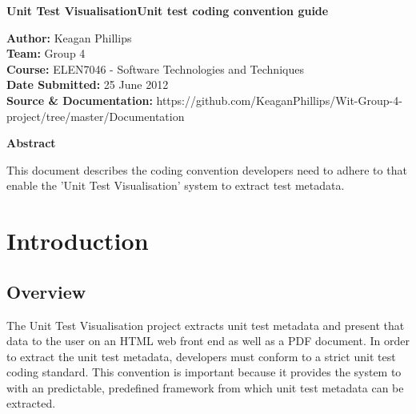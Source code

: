 \documentclass[a4paper,12pt]{article}
\begin{document}
\begin{center}
\begin{Huge}
\textbf{{\LARGE Unit Test Visualisation\linebreak Unit test coding convention guide }}
\linebreak
\linebreak
\linebreak
\linebreak
\end{Huge}\end{center}




\begin{small}
\begin{flushleft}
\textbf{Author:} Keagan Phillips
\\
\textbf{Team:} Group 4
\\
\textbf{Course:} ELEN7046 - Software Technologies and Techniques
\\
\textbf{Date Submitted:} 25 June 2012
\\
\textbf{Source \& Documentation:} https://github.com/KeaganPhillips/Wit-Group-4-project/tree/master/Documentation
\linebreak
\linebreak
\linebreak
\linebreak
\linebreak
\end{flushleft}

\end{small}


\begin{flushleft}
\textbf{{\large Abstract}}
\end{flushleft}
This document describes the coding convention developers need to adhere to that enable the 'Unit Test Visualisation' system to extract test metadata. 
\clearpage


\tableofcontents


\clearpage

\section{Introduction}
\subsection{Overview}
The Unit Test Visualisation project extracts unit test metadata and present that data to the user on an HTML web front end as well as a PDF document. In order to extract the unit test metadata, developers must conform to a strict unit test coding standard. This convention is important because it provides the system to with an predictable, predefined framework from which unit test metadata can be extracted.
\end{document}
